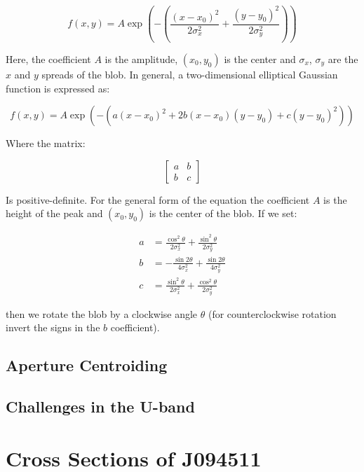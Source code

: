 \documentclass[a4paper,11pt]{article}
\begin{document}
\begin{equation}
    f(x,y) = A \exp\left(- \left(\frac{(x-x_0)^2}{2\sigma_x^2} + \frac{(y-y_0)^2}{2\sigma_y^2} \right)\right)
\end{equation}

\noindent Here, the coefficient $A$ is the amplitude, $(x_0, y_0)$ is the center and
$\sigma_x$, $\sigma_y$ are the $x$ and $y$ spreads of the blob. In general, a
two-dimensional elliptical Gaussian function is expressed as:

\begin{equation}
    f(x,y) = A \exp\left(- \left(a(x - x_0)^2 + 2b(x-x_0)(y-y_0) + c(y-y_0)^2 \right)\right)
\end{equation}

\noindent Where the matrix:

\begin{equation}
    \begin{bmatrix} a & b \\ b & c \end{bmatrix}
\end{equation}

\noindent Is positive-definite. For the general form of the equation the
coefficient $A$ is the height of the peak and $(x_0, y_0)$ is the center of the
blob. If we set:

\begin{align}
a & = \frac{\cos^2\theta}{2\sigma_x^2} + \frac{\sin^2\theta}{2\sigma_y^2} \\
b & = -\frac{\sin2\theta}{4\sigma_x^2} + \frac{\sin2\theta}{4\sigma_y^2} \\
c & = \frac{\sin^2\theta}{2\sigma_x^2} + \frac{\cos^2\theta}{2\sigma_y^2}
\end{align}

then we rotate the blob by a clockwise angle $\theta$ (for counterclockwise
rotation invert the signs in the $b$ coefficient). %

\subsection{Aperture Centroiding}
\subsection{Challenges in the U-band}
\section{Cross Sections of J094511}
\end{document}
